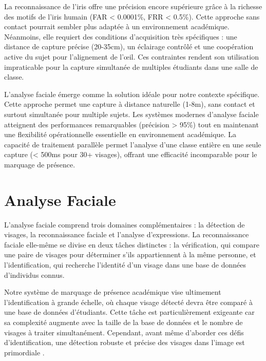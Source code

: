 \begin{onehalfspace}
\hspace{0.65cm} La reconnaissance de l'iris offre une précision encore supérieure grâce à la richesse des motifs de l'iris humain (FAR < 0.0001\%, FRR < 0.5\%). Cette approche sans contact pourrait sembler plus adaptée à un environnement académique. Néanmoins, elle requiert des conditions d'acquisition très spécifiques : une distance de capture précise (20-35cm), un éclairage contrôlé et une coopération active du sujet pour l'alignement de l'œil. Ces contraintes rendent son utilisation impraticable pour la capture simultanée de multiples étudiants dans une salle de classe.

\hspace{0.65cm}L'analyse faciale émerge comme la solution idéale pour notre contexte spécifique. Cette approche permet une capture à distance naturelle (1-8m), sans contact et surtout simultanée pour multiple sujets. Les systèmes modernes d'analyse faciale atteignent des performances remarquables (précision > 95\%) tout en maintenant une flexibilité opérationnelle essentielle en environnement académique. La capacité de traitement parallèle permet l'analyse d'une classe entière en une seule capture (< 500ms pour 30+ visages), offrant une efficacité incomparable pour le marquage de présence.


\section{Analyse Faciale}
\hspace{0.65cm}L'analyse faciale comprend trois domaines complémentaires : la détection de visages, la reconnaissance faciale et l'analyse d'expressions. La reconnaissance faciale elle-même se divise en deux tâches distinctes : la vérification, qui compare une paire de visages pour déterminer s'ils appartiennent à la même personne, et l'identification, qui recherche l'identité d'un visage dans une base de données d'individus connus.

\hspace{0.65cm} Notre système de marquage de présence académique vise ultimement l'identification à grande échelle, où chaque visage détecté devra être comparé à une base de données d'étudiants. Cette tâche est particulièrement exigeante car sa complexité augmente avec la taille de la base de données et le nombre de visages à traiter simultanément. Cependant, avant même d'aborder ces défis d'identification, une détection robuste et précise des visages dans l'image est primordiale \cite{186Текстстатті46511020230930}.


\end{onehalfspace}
